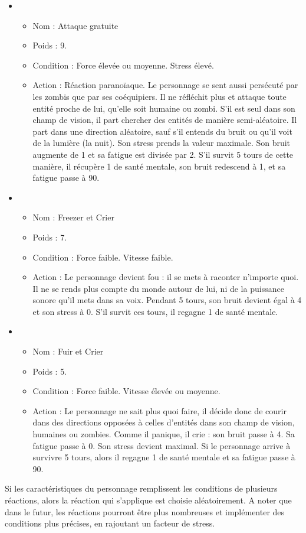 \begin{itemize}
\begin{itemize}
   \end{itemize}
   \item \begin{itemize}
   		\item Nom : Attaque gratuite
   		\item Poids : 9.
   	 	\item Condition : Force élevée ou moyenne. Stress élevé.
   	 	\item Action : Réaction paranoïaque. Le personnage se sent aussi persécuté par les zombis que par ses coéquipiers. Il ne réfléchit plus et attaque toute entité proche de lui, qu'elle soit humaine ou zombi. S'il est seul dans son champ de vision, il part chercher des entités de manière semi-aléatoire. Il part dans une direction aléatoire, sauf s'il entends du bruit ou qu'il voit de la lumière (la nuit). Son stress prends la valeur maximale. Son bruit augmente de 1 et sa fatigue est divisée par 2. S'il survit 5 tours de cette manière, il récupère 1 de santé mentale, son bruit redescend à 1, et sa fatigue passe à 90.
   \end{itemize}
   \item \begin{itemize}
   		\item Nom : Freezer et Crier
   		\item Poids : 7.
   	 	\item Condition : Force faible. Vitesse faible.
   	 	\item Action : Le personnage devient fou : il se mets à raconter n'importe quoi. Il ne se rends plus compte du monde autour de lui, ni de la puissance sonore qu'il mets dans sa voix. Pendant 5 tours, son bruit devient égal à 4 et son stress à 0. S'il survit ces tours, il regagne 1 de santé mentale.
   \end{itemize}
   \item \begin{itemize}
   		\item Nom : Fuir et Crier
   		\item Poids : 5.
   	 	\item Condition : Force faible. Vitesse élevée ou moyenne.
   	 	\item Action : Le personnage ne sait plus quoi faire, il décide donc de courir dans des directions opposées à celles d'entités dans son champ de vision, humaines ou zombies. Comme il panique, il crie : son bruit passe à 4. Sa fatigue passe à 0. Son stress devient maximal. Si le personnage arrive à survivre 5 tours, alors il regagne 1 de santé mentale et sa fatigue passe à 90.
   \end{itemize}
\end{itemize}
Si les caractéristiques du personnage remplissent les conditions de plusieurs réactions, alors la réaction qui s'applique est choisie aléatoirement. A noter que dans le futur, les réactions pourront être plus nombreuses et implémenter des conditions plus précises, en rajoutant un facteur de stress.
